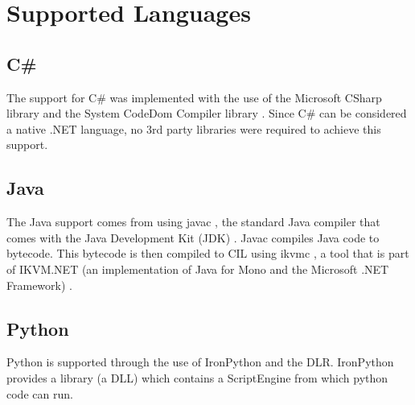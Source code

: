 \section{Supported Languages}

\subsection{C\#}
The support for C\# was implemented with the use of the Microsoft CSharp library \cite{MicrosoftCSharp} and the System CodeDom Compiler library \cite{CodeDomCompiler}. Since C\# can be considered a native .NET language, no 3rd party libraries were required to achieve this support.

\subsection{Java}
The Java support comes from using javac \cite{Javac}, the standard Java compiler that comes with the Java Development Kit (JDK) \cite{JDK}. Javac compiles Java code to bytecode. This bytecode is then compiled to CIL using ikvmc \cite{IKVMC}, a tool that is part of IKVM.NET (an implementation of Java for Mono and the Microsoft .NET Framework) \cite{IKVM.NET}.

\subsection{Python}
Python is supported through the use of IronPython \cite{IronPython} and the DLR. IronPython provides a library (a DLL) which contains a ScriptEngine from which python code can run.
